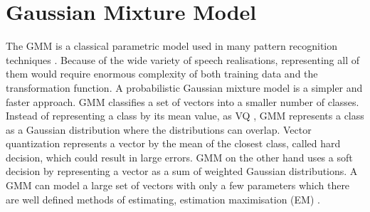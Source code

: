 






\section{Gaussian Mixture Model} %
\label{sec:gaussian_mixture_model}
The GMM is a classical parametric model used in many pattern recognition techniques \cite{stylianou98}. Because of the wide variety of speech realisations, representing all of them would require enormous complexity of both training data and the transformation function. A probabilistic Gaussian mixture model is a simpler and faster approach. GMM classifies a set of vectors into a smaller number of classes. Instead of representing a class by its mean value, as VQ \cite{gray84}, GMM represents a class as a Gaussian distribution where the distributions can overlap. Vector quantization represents a vector by the mean of the closest class, called hard decision, which could result in large errors. GMM on the other hand uses a soft decision by representing a vector as a sum of weighted Gaussian distributions. A GMM can model a large set of vectors with only a few parameters which there are well defined methods of estimating, \eg estimation maximisation (EM) \cite{taletek}.

